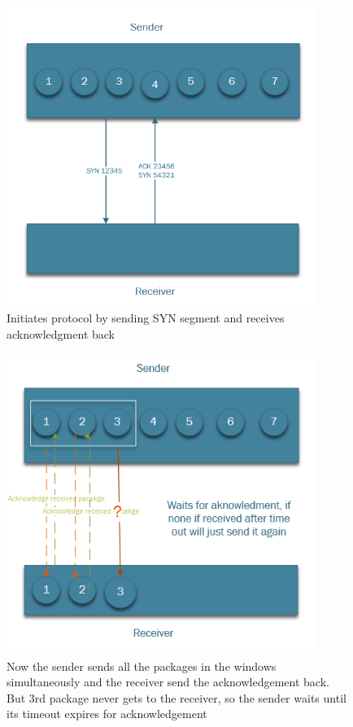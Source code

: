 \documentclass{WeSTassignment}
\begin{document}
\begin{figure}[h]
  	\centering
  	\includegraphics[width=0.9\textwidth]{swp1.png}
   	\caption{Initiates protocol by sending SYN segment and receives acknowledgment back}
     \label{fig:step1}
\end{figure}


\begin{figure}[h]
  	\centering
  	\includegraphics[width=0.9\textwidth]{swp2.png}
   	\caption{Now the sender sends all the packages in the windows simultaneously and the receiver send the acknowledgement back.
   	But 3rd package never gets to the receiver, so the sender waits until its timeout expires for acknowledgement}
     \label{fig:server}
\end{figure}
\end{document}
